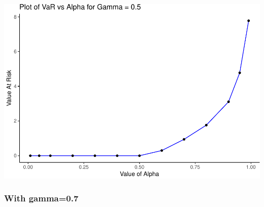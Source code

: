 \documentclass[]{article}
\begin{document}
\includegraphics{Integrated_Management_Formulation_Model_files/figure-latex/unnamed-chunk-16-1.pdf}

\subsubsection{With gamma=0.7}\label{with-gamma0.7}
\end{document}
